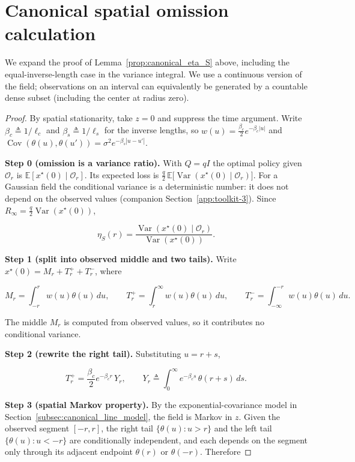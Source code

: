 \section{Canonical spatial omission calculation}
\label{app:technical-canonical}
We expand the proof of Lemma~\ref{prop:canonical_eta_S} above,
including the equal-inverse-length case in the variance integral.
We use a continuous version of the field; observations on an interval can
equivalently be generated by a countable dense subset (including the center
at radius zero).
\begin{proof}
By spatial stationarity, take $z=0$ and suppress the time argument. Write $\beta_c\triangleq1/\ell_c$ and $\beta_s\triangleq1/\ell_s$ for the inverse lengths, so $w(u)=\tfrac{\beta_c}{2}e^{-\beta_c|u|}$ and $\operatorname{Cov}(\theta(u),\theta(u'))=\sigma^2e^{-\beta_s|u-u'|}$.

\textbf{Step 0 (omission is a variance ratio).} With $Q=qI$ the optimal policy given $\mathcal O_r$ is $\mathbb E[x^\star(0)\mid\mathcal O_r]$. Its expected loss is $\tfrac q2\,\mathbb E\big[\operatorname{Var}(x^\star(0)\mid\mathcal O_r)\big]$. For a Gaussian field the conditional variance is a deterministic number: it does not depend on the observed values (companion Section~\ref{app:toolkit-3}). Since $R_\infty=\tfrac q2\operatorname{Var}(x^\star(0))$,

\[
\eta_S(r)=\frac{\operatorname{Var}(x^\star(0)\mid\mathcal O_r)}{\operatorname{Var}(x^\star(0))}.
\]

\textbf{Step 1 (split into observed middle and two tails).} Write $x^\star(0)=M_r+T_r^++T_r^-$, where

\[
M_r=\int_{-r}^{r}w(u)\theta(u)\,du,\qquad T_r^+=\int_r^\infty w(u)\theta(u)\,du,\qquad T_r^-=\int_{-\infty}^{-r}w(u)\theta(u)\,du .
\]

The middle $M_r$ is computed from observed values, so it contributes no conditional variance.

\textbf{Step 2 (rewrite the right tail).} Substituting $u=r+s$,

\[
T_r^+=\frac{\beta_c}{2}e^{-\beta_c r}\,Y_r,\qquad Y_r\triangleq\int_0^\infty e^{-\beta_c s}\,\theta(r+s)\,ds .
\]

\textbf{Step 3 (spatial Markov property).} By the exponential-covariance model in Section~\ref{subsec:canonical_line_model}, the field is Markov in $z$. Given the observed segment $[-r,r]$, the right tail $\{\theta(u):u>r\}$ and the left tail $\{\theta(u):u<-r\}$ are conditionally independent, and each depends on the segment only through its adjacent endpoint $\theta(r)$ or $\theta(-r)$. Therefore


\end{proof}
